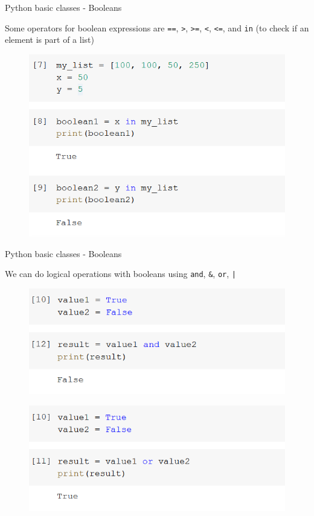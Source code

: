 \documentclass[aspectratio=169]{beamer}
\begin{document}
\begin{frame}{Python basic classes - Booleans}

	Some operators for boolean expressions are \texttt{==}, \texttt{>}, \texttt{>=}, \texttt{<}, \texttt{<=}, and \texttt{in} (to check if an element is part of a list)

	\begin{figure}
		\centering
		\includegraphics[width=0.6\linewidth]{img/bool_in.png}
	\end{figure}

\end{frame}

\begin{frame}{Python basic classes - Booleans}

	We can do logical operations with booleans using \texttt{and}, \texttt{\&}, \texttt{or}, \texttt{|}

	\begin{multicols}{2}

		\begin{figure}
			\centering
			\includegraphics[width=0.8\linewidth]{img/and.png}
		\end{figure}
		\begin{figure}
			\centering
			\includegraphics[width=0.8\linewidth]{img/or.png}
		\end{figure}

	\end{multicols}


\end{frame}
\end{document}
